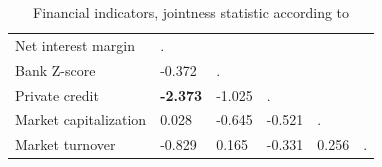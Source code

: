 \begin{refsection}
\begin{subappendices}
\begin{table}[!htbp]
\caption{Financial indicators, jointness statistic according to \textcite{doppelhoferweeks2009}}
\label{ch2tab:joint3}
\small
\centering
\begin{tabular}{llllll}
   \toprule
  Net interest margin & . &  &  & & \\ 
  Bank Z-score & -0.372 & . &  &  & \\ 
  Private credit & \textbf{-2.373} & -1.025 & . &  & \\ 
  Market capitalization & 0.028 & -0.645 & -0.521 & . & \\ 
  Market turnover & -0.829 & 0.165 & -0.331 & 0.256 & . \\ 
   \bottomrule
\end{tabular}
\end{table}  
%
\end{subappendices}
\end{refsection}